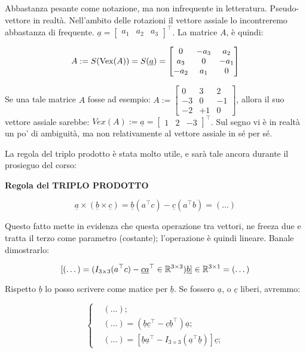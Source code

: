 Abbastanza pesante come notazione, ma non infrequente in letteratura. Pseudo-vettore in realtà. Nell'ambito delle rotazioni il vettore assiale lo incontreremo abbastanza di frequente. $\underline{a}=\begin{bmatrix}a_1&a_2&a_3\end{bmatrix}^\top$. La matrice $A$, è quindi:

\[
	A := S(\operatorname{Vex}(A)) = S(\underline{a}) =
	\begin{bmatrix}0&-a_3&a_2\\a_3&0&-a_1\\-a_2&a_1&0\end{bmatrix}
\]

Se una tale matrice $A$ fosse ad esempio: $A:=\begin{bmatrix}0&3&2\\-3&0&-1\\-2&+1&0\end{bmatrix}$, allora il suo vettore assiale sarebbe: $Vex(A):=\underline{a}=\begin{bmatrix}1&2&-3\end{bmatrix}^\top$. Sul segno vi è in realtà un po' di ambiguità, ma non relativamente al vettore assiale in sé per sé.

La regola del triplo prodotto è stata molto utile, e sarà tale ancora durante il prosieguo del corso:

\begin{thrm}{\textbf{Regola del TRIPLO PRODOTTO}}

\[
	\underline{a}\times(\underline{b}\times\underline{c}) = \underline{b}(a^\top c) - \underline{c}(a^\top b) = (\dots)
\]

\end{thrm}

Questo fatto mette in evidenza che questa operazione tra vettori, ne freeza due e tratta il terzo come parametro (costante); l'operazione è quindi lineare. Banale dimostrarlo:

\[
	[(\dots) = (I_{3\times 3}(a^\top c) -\underline{c}\underline{a}^\top \in\mathbb{R}^{3\times 3})\underline{b}]\in\mathbb{R}^{3\times 1} = (\dots)\\
\]

Rispetto $\underline{b}$ lo posso scrivere come matice per $\underline{b}$. Se fossero $\underline{a}$, o $\underline{c}$ liberi, avremmo:

\[
	\left\{
	\begin{aligned}
	&(\dots);\\
	&(\dots) = (\underline{b}\underline{c}^\top -\underline{c}\underline{b}^\top)\underline{a};\\
	&(\dots) = [\underline{b}\underline{a}^\top -I_{3\times 3}(\underline{a}^\top\underline{b})]\underline{c};
	\end{aligned}
	\right.
\]

